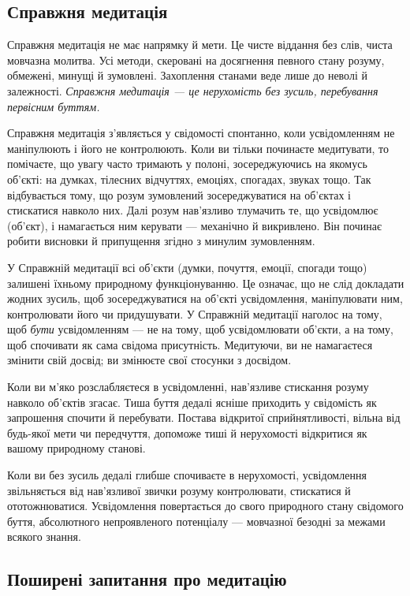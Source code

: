 \subsection*{Справжня медитація}

Справжня медитація не має напрямку й мети. Це чисте віддання без слів, чиста мовчазна молитва. Усі методи, скеровані на досягнення певного стану розуму, обмежені, минущі й зумовлені. Захоплення станами веде лише до неволі й залежності. \emph{Справжня медитація — це нерухомість без зусиль, перебування первісним буттям.}

Справжня медитація з'являється у свідомості спонтанно, коли усвідомленням не маніпулюють і його не контролюють. Коли ви тільки починаєте медитувати, то помічаєте, що увагу часто тримають у полоні, зосереджуючись на якомусь об'єкті: на думках, тілесних відчуттях, емоціях, спогадах, звуках тощо. Так відбувається тому, що розум зумовлений зосереджуватися на об'єктах і стискатися навколо них. Далі розум нав'язливо тлумачить те, що усвідомлює (об'єкт), і намагається ним керувати — механічно й викривлено. Він починає робити висновки й припущення згідно з минулим зумовленням.

У Справжній медитації всі об'єкти (думки, почуття, емоції, спогади тощо) залишені їхньому природному функціонуванню. Це означає, що не слід докладати жодних зусиль, щоб зосереджуватися на об'єкті усвідомлення, маніпулювати ним, контролювати його чи придушувати. У Справжній медитації наголос на тому, щоб \emph{бути} усвідомленням — не на тому, щоб усвідомлювати об'єкти, а на тому, щоб спочивати як сама свідома присутність. Медитуючи, ви не намагаєтеся змінити свій досвід; ви змінюєте свої стосунки з досвідом.

Коли ви м'яко розслабляєтеся в усвідомленні, нав'язливе стискання розуму навколо об'єктів згасає. Тиша буття дедалі ясніше приходить у свідомість як запрошення спочити й перебувати. Постава відкритої сприйнятливості, вільна від будь-якої мети чи передчуття, допоможе тиші й нерухомості відкритися як вашому природному станові.

Коли ви без зусиль дедалі глибше спочиваєте в нерухомості, усвідомлення звільняється від нав'язливої звички розуму контролювати, стискатися й ототожнюватися. Усвідомлення повертається до свого природного стану свідомого буття, абсолютного непроявленого потенціалу — мовчазної безодні за межами всякого знання.

\subsection*{Поширені запитання про медитацію}

